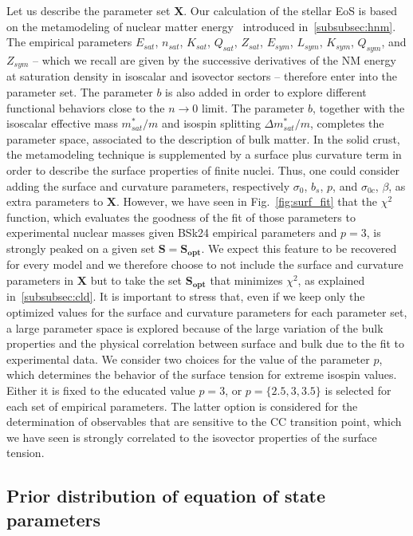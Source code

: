 Let us describe the parameter set $\bm{X}$. Our calculation
of the stellar EoS is based on the metamodeling of nuclear matter
energy~\cite{Margueron2018a} introduced in~\ref{subsubsec:hnm}. The empirical
parameters $E_{sat}$, $n_{sat}$, $K_{sat}$, $Q_{sat}$, $Z_{sat}$, $E_{sym}$,
$L_{sym}$, $K_{sym}$, $Q_{sym}$, and $Z_{sym}$ -- which we recall are given by 
the successive derivatives of the NM energy at saturation density in isoscalar 
and isovector sectors -- therefore 
enter into the parameter set. The parameter $b$ is also added in order 
to explore different functional behaviors close to the $n\rightarrow 0$ limit.
The parameter $b$, together with the isoscalar effective mass $m_{sat}^*/m$ and 
isospin splitting $\Delta m_{sat}^*/m$, completes the parameter space, 
associated to the description of bulk matter.
In the solid crust, the metamodeling technique is supplemented by a surface 
plus curvature term in order to describe the surface properties of finite 
nuclei. Thus, one could consider adding the surface and curvature parameters, 
respectively $\sigma_0$, $b_s$, $p$, and $\sigma_{0c}$, $\beta$, as extra
parameters to $\bm{X}$. However, we have
seen in Fig.~\ref{fig:surf_fit} that the $\chi^2$ function, which evaluates the 
goodness of the fit of those parameters to experimental nuclear masses given 
BSk24 empirical parameters and $p=3$, is strongly peaked on a given set
$\bm{S}=\bm{S_{opt}}$. We expect this 
feature to be recovered for every model and we therefore choose to not include 
the surface and curvature parameters in $\bm{X}$ but to take the set 
$\bm{S_{opt}}$ that minimizes $\chi^2$, as explained in~\ref{subsubsec:cld}.
It is important to stress that, even if we keep only the optimized values for
the surface and curvature parameters for each parameter set, a large parameter
space is explored because of the large variation of the bulk properties and the
physical correlation between surface and bulk due to the fit to experimental
data.
We consider two choices for the value of the parameter $p$, which determines 
the behavior of the surface tension for extreme isospin values. Either it is 
fixed to the educated value $p=3$, or $p=\{2.5,3,3.5\}$ is selected for each
set of empirical parameters. The latter option is considered for the
determination of observables that are sensitive to the CC transition point, 
which we have seen is strongly correlated to the isovector properties of the 
surface tension.

\subsection{Prior distribution of equation of state parameters}\label{subsec:prior}

